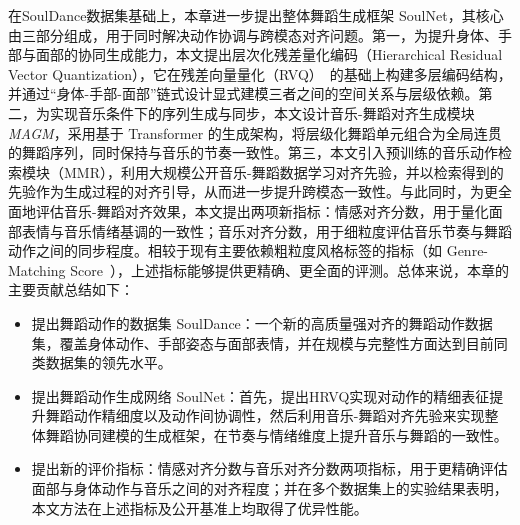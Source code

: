 在SoulDance数据集基础上，本章进一步提出整体舞蹈生成框架 SoulNet，其核心由三部分组成，用于同时解决动作协调与跨模态对齐问题。第一，为提升身体、手部与面部的协同生成能力，本文提出层次化残差量化编码（Hierarchical Residual Vector Quantization），它在残差向量量化（RVQ）~\cite{barnes1996advances,huijben2024residual}的基础上构建多层编码结构，并通过“身体-手部-面部”链式设计显式建模三者之间的空间关系与层级依赖。第二，为实现音乐条件下的序列生成与同步，本文设计音乐-舞蹈对齐生成模块\textit{MAGM}，采用基于 Transformer 的生成架构，将层级化舞蹈单元组合为全局连贯的舞蹈序列，同时保持与音乐的节奏一致性。第三，本文引入预训练的音乐动作检索模块（MMR），利用大规模公开音乐-舞蹈数据学习对齐先验，并以检索得到的先验作为生成过程的对齐引导，从而进一步提升跨模态一致性。与此同时，为更全面地评估音乐-舞蹈对齐效果，本文提出两项新指标：情感对齐分数，用于量化面部表情与音乐情绪基调的一致性；音乐对齐分数，用于细粒度评估音乐节奏与舞蹈动作之间的同步程度。相较于现有主要依赖粗粒度风格标签的指标（如 Genre-Matching Score~\cite{li2023finedance}），上述指标能够提供更精确、更全面的评测。总体来说，本章的主要贡献总结如下：
\begin{itemize}
    \item 提出舞蹈动作的数据集 SoulDance：一个新的高质量强对齐的舞蹈动作数据集，覆盖身体动作、手部姿态与面部表情，并在规模与完整性方面达到目前同类数据集的领先水平。
    \item 提出舞蹈动作生成网络 SoulNet：首先，提出HRVQ实现对动作的精细表征提升舞蹈动作精细度以及动作间协调性，然后利用音乐-舞蹈对齐先验来实现整体舞蹈协同建模的生成框架，在节奏与情绪维度上提升音乐与舞蹈的一致性。
    \item 提出新的评价指标：情感对齐分数与音乐对齐分数两项指标，用于更精确评估面部与身体动作与音乐之间的对齐程度；并在多个数据集上的实验结果表明，本文方法在上述指标及公开基准上均取得了优异性能。
\end{itemize}




